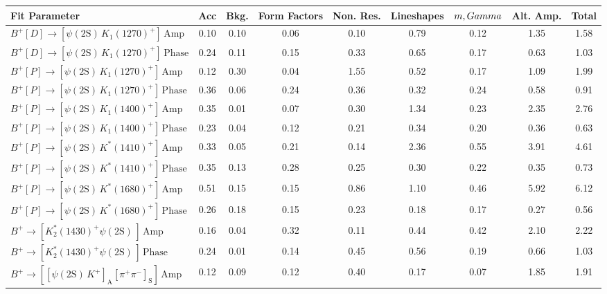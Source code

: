 \begin{tabular}{l  c  c  c  c  c  c  c  | c }
\hline
\hline
Fit Parameter & Acc & Bkg. & Form Factors & Non. Res. & Lineshapes & $m,\\Gamma$ & Alt. Amp. &  Total  \\ 
\hline
$B^{+}\left[D\right]\rightarrow \left[\psi(\text{2S})\,K_{1}(1270)^{+}\right]\,\text{Amp}$ & 0.10 & 0.10 & 0.06 & 0.10 & 0.79 & 0.12 & 1.35 & 1.58 \\ 
$B^{+}\left[D\right]\rightarrow \left[\psi(\text{2S})\,K_{1}(1270)^{+}\right]\,\text{Phase}$ & 0.24 & 0.11 & 0.15 & 0.33 & 0.65 & 0.17 & 0.63 & 1.03 \\ 
$B^{+}\left[P\right]\rightarrow \left[\psi(\text{2S})\,K_{1}(1270)^{+}\right]\,\text{Amp}$ & 0.12 & 0.30 & 0.04 & 1.55 & 0.52 & 0.17 & 1.09 & 1.99 \\ 
$B^{+}\left[P\right]\rightarrow \left[\psi(\text{2S})\,K_{1}(1270)^{+}\right]\,\text{Phase}$ & 0.36 & 0.06 & 0.24 & 0.36 & 0.32 & 0.24 & 0.58 & 0.91 \\ 
$B^{+}\left[P\right]\rightarrow \left[\psi(\text{2S})\,K_{1}(1400)^{+}\right]\,\text{Amp}$ & 0.35 & 0.01 & 0.07 & 0.30 & 1.34 & 0.23 & 2.35 & 2.76 \\ 
$B^{+}\left[P\right]\rightarrow \left[\psi(\text{2S})\,K_{1}(1400)^{+}\right]\,\text{Phase}$ & 0.23 & 0.04 & 0.12 & 0.21 & 0.34 & 0.20 & 0.36 & 0.63 \\ 
$B^{+}\left[P\right]\rightarrow \left[\psi(\text{2S})\,K^{*}(1410)^{+}\right]\,\text{Amp}$ & 0.33 & 0.05 & 0.21 & 0.14 & 2.36 & 0.55 & 3.91 & 4.61 \\ 
$B^{+}\left[P\right]\rightarrow \left[\psi(\text{2S})\,K^{*}(1410)^{+}\right]\,\text{Phase}$ & 0.35 & 0.13 & 0.28 & 0.25 & 0.30 & 0.22 & 0.35 & 0.73 \\ 
$B^{+}\left[P\right]\rightarrow \left[\psi(\text{2S})\,K^{*}(1680)^{+}\right]\,\text{Amp}$ & 0.51 & 0.15 & 0.15 & 0.86 & 1.10 & 0.46 & 5.92 & 6.12 \\ 
$B^{+}\left[P\right]\rightarrow \left[\psi(\text{2S})\,K^{*}(1680)^{+}\right]\,\text{Phase}$ & 0.26 & 0.18 & 0.15 & 0.23 & 0.18 & 0.17 & 0.27 & 0.56 \\ 
$B^{+}\rightarrow \left[K_{2}^{*}(1430)^{+}\psi(\text{2S})\,\right]\,\text{Amp}$ & 0.16 & 0.04 & 0.32 & 0.11 & 0.44 & 0.42 & 2.10 & 2.22 \\ 
$B^{+}\rightarrow \left[K_{2}^{*}(1430)^{+}\psi(\text{2S})\,\right]\,\text{Phase}$ & 0.24 & 0.01 & 0.14 & 0.45 & 0.56 & 0.19 & 0.66 & 1.03 \\ 
$B^{+}\rightarrow \left[\left[\psi(\text{2S})\,K^{+}\right]_{\text{A}}\left[\pi^{+}\pi^{-}\right]_{\text{S}}\right]\,\text{Amp}$ & 0.12 & 0.09 & 0.12 & 0.40 & 0.17 & 0.07 & 1.85 & 1.91 \\ 

\end{tabular}
